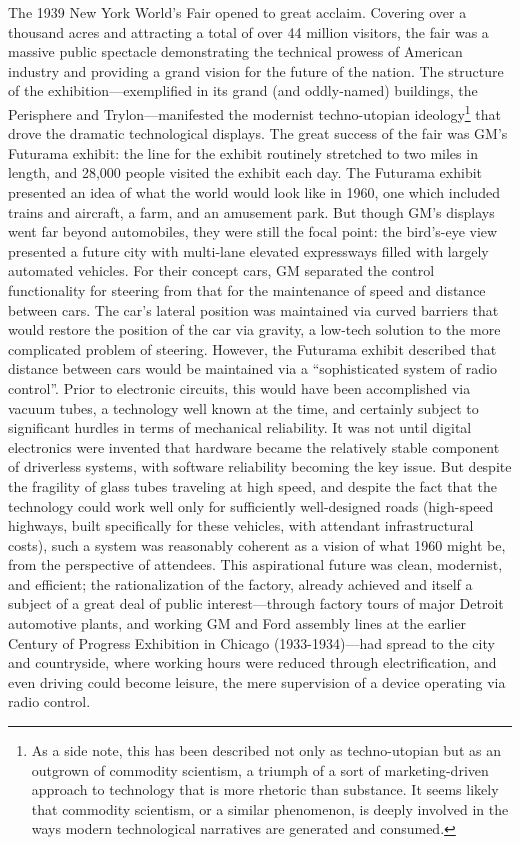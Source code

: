 The 1939 New York World's Fair opened to great acclaim. Covering over
a thousand acres and attracting a total of over 44 million visitors,
the fair was a massive public spectacle demonstrating the technical
prowess of American industry and providing a grand vision for the
future of the nation. The structure of the exhibition—exemplified in
its grand (and oddly-named) buildings, the Perisphere and
Trylon—manifested the modernist techno-utopian ideology\footnote{As a
  side note, this has been described not only as techno-utopian but as
an outgrown of commodity scientism, a triumph of a sort of
marketing-driven approach to technology that is more rhetoric than
substance.\cite{???-DMsclass} It seems likely that commodity
scientism, or a similar phenomenon, is deeply involved in the ways
modern technological narratives are generated and consumed.} that drove the
dramatic technological displays\cite{???}. The great success of the fair was
GM's Futurama exhibit: the line for the exhibit routinely stretched to
two miles in length, and 28,000 people visited the exhibit each day.
The Futurama exhibit presented an idea of what the world would look
like in 1960, one which included trains and aircraft, a farm, and an
amusement park.\cite{???} But though GM's displays went far beyond automobiles,
they were still the focal point: the bird's-eye view presented a
future city with multi-lane elevated expressways filled with largely
automated vehicles. For their concept cars, GM separated the control
functionality for steering from that for the maintenance of speed and
distance between cars. The car's lateral position was maintained via
curved barriers that would restore the position of the car via
gravity, a low-tech solution to the more complicated problem of
steering. However, the Futurama exhibit described that distance
between cars would be maintained via a ``sophisticated system of radio
control''\cite{???}. Prior to electronic circuits, this would have been
accomplished via vacuum tubes, a technology well known at the time,
and certainly subject to significant hurdles in terms of mechanical
reliability. It was not until digital electronics were invented that
hardware became the relatively stable component of driverless systems,
with software reliability becoming the key issue\cite{???}. But despite the
fragility of glass tubes traveling at high speed, and despite the fact
that the technology could work well only for sufficiently
well-designed roads (high-speed highways, built specifically for these
vehicles, with attendant infrastructural costs), such a system was
reasonably coherent as a vision of what 1960 might be, from the
perspective of attendees. This aspirational future was clean,
modernist, and efficient; the rationalization of the factory, already
achieved and itself a subject of a great deal of public
interest---through factory tours of major Detroit automotive plants, and
working GM and Ford assembly lines at the earlier Century of Progress
Exhibition in Chicago (1933-1934)\cite{???}---had spread to the city and
countryside, where working hours were reduced through electrification,
and even driving could become leisure, the mere supervision of a
device operating via radio control.

